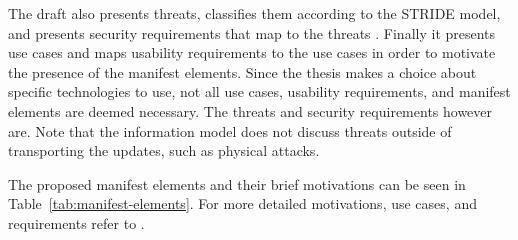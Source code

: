 \documentclass[0-thesis.tex]{subfiles}
\begin{document}
The draft also presents threats, classifies them according to the STRIDE model, and
presents security requirements that map to the threats \parencite{stride}. Finally it
presents use cases and maps usability requirements to the use cases in order to motivate
the presence of the manifest elements. Since the thesis makes a choice about specific
technologies to use, not all use cases, usability requirements, and manifest elements are
deemed necessary. The threats and security requirements however are. Note that the
information model does not discuss threats outside of transporting the updates, such as
physical attacks.

The proposed manifest elements and their brief motivations can be seen in
Table~\ref{tab:manifest-elements}. For more detailed motivations, use cases, and
requirements refer to \parencite{suit-information-model}.
\end{document}
